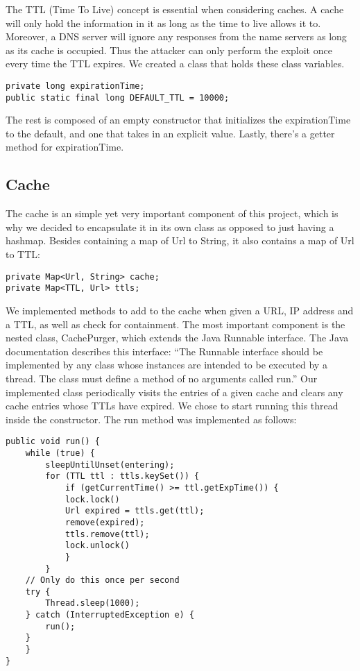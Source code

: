 \documentclass[a4paper, 12pt]{article} %
\begin{document}
The TTL (Time To Live) concept is essential when considering caches. A cache will only hold the information in it as long as the time to live allows it to. Moreover, a DNS server will ignore any responses from the name servers as long as its cache is occupied. Thus the attacker can only perform the exploit once every time the TTL expires. We created a class that holds these class variables. 

\begin{lstlisting}
private long expirationTime;
public static final long DEFAULT_TTL = 10000;
\end{lstlisting}

The rest is composed of an empty constructor that initializes the expirationTime to the default, and one that takes in an explicit value. Lastly, there’s a getter method for expirationTime. 

\subsection*{Cache}

The cache is an simple yet very important component of this project, which is why we decided to encapsulate it in its own class as opposed to just having a hashmap. Besides containing a map of Url to String, it also contains a map of Url to TTL:

\begin{lstlisting}
private Map<Url, String> cache;
private Map<TTL, Url> ttls;
\end{lstlisting}

We implemented methods to add to the cache when given a URL, IP address and a TTL, as well as check for containment. The most important component is the nested class, CachePurger, which extends the Java Runnable interface. The Java documentation describes this interface: “The Runnable interface should be implemented by any class whose instances are intended to be executed by a thread. The class must define a method of no arguments called run.” Our implemented class periodically visits the entries of a given cache and clears any cache entries whose TTLs have expired. We chose to start running this thread inside the constructor. The run method was implemented as follows:

\begin{lstlisting}
public void run() {
    while (true) {
	    sleepUntilUnset(entering);
        for (TTL ttl : ttls.keySet()) {
            if (getCurrentTime() >= ttl.getExpTime()) {
            lock.lock()
            Url expired = ttls.get(ttl);
            remove(expired);
            ttls.remove(ttl);
            lock.unlock()
            }
        }
    // Only do this once per second
    try {
        Thread.sleep(1000);
    } catch (InterruptedException e) {
        run();
    }
    }
}
\end{lstlisting}
\end{document}
